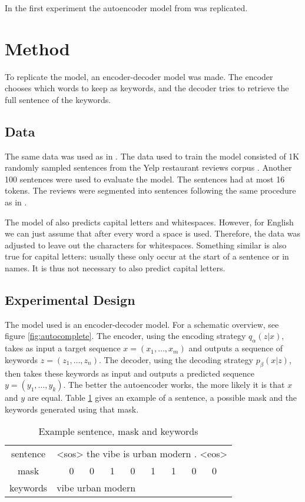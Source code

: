 In the first experiment the autoencoder model from  was replicated. 

\section{Method}
To replicate the model, an encoder-decoder model was made. The encoder chooses which words to keep as keywords, and the decoder tries to retrieve the full sentence of the keywords. 

\subsection{Data}
\label{sec:data}
The same data was used as in .
The data used to train the model consisted of 1K randomly sampled sentences from the Yelp restaurant reviews corpus .
Another 100 sentences were used to evaluate the model. 
The sentences had at most 16 tokens. 
The reviews were segmented into sentences following the same procedure as in . 

The model of  also predicts capital letters and whitespaces. 
However, for English we can just assume that after every word a space is used. 
Therefore, the data was adjusted to leave out the characters for whitespaces. 
Something similar is also true for capital letters: usually these only occur at the start of a sentence or in names. 
It is thus not necessary to also predict capital letters. 

\subsection{Experimental Design}
The model used is an encoder-decoder model.
For a schematic overview, see figure \ref{fig:autocomplete}.
The encoder, using the encoding strategy $q_{\alpha}(z|x)$, takes as input a target sequence $x = (x_1, \dots, x_m)$ and outputs a sequence of keywords $z = (z_1, \dots, z_n)$.
The decoder, using the decoding strategy $p_{\beta}(x|z)$, then takes these keywords as input and outputs a predicted sequence $y = (y_1, \dots, y_k)$. 
The better the autoencoder works, the more likely it is that $x$ and $y$ are equal. 
Table \ref{tab:example} gives an example of a sentence, a possible mask and the keywords generated using that mask.

\begin{table}
    \centering
    \begin{tabular}{|cl|}
        \hline
        sentence & <sos> the vibe is urban modern . <eos> \\
        mask & $\quad$ 0 $\quad$ 0 $\quad$ 1 $\quad$ 0 $\quad$ 1 $\quad$ 1 $\quad$ 0 $\quad$ 0 \\
        keywords & vibe urban modern  \\
        \hline
    \end{tabular}
    \caption{Example sentence, mask and keywords}
    \label{tab:example}
\end{table}

